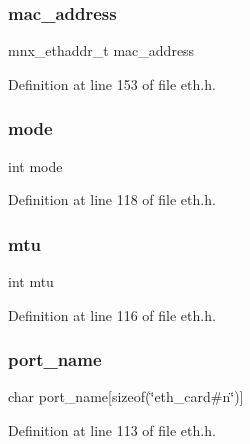 \subsubsection{\texorpdfstring{mac\+\_\+address}{mac\_address}}
{\footnotesize\ttfamily mnx\+\_\+ethaddr\+\_\+t mac\+\_\+address}



Definition at line 153 of file eth.\+h.

\hypertarget{structeth__card_a1ea5d0cb93f22f7d0fdf804bd68c3326}{}\label{structeth__card_a1ea5d0cb93f22f7d0fdf804bd68c3326} 
\subsubsection{\texorpdfstring{mode}{mode}}
{\footnotesize\ttfamily int mode}



Definition at line 118 of file eth.\+h.

\hypertarget{structeth__card_a5f8594e356005c64e4a2625755b6c849}{}\label{structeth__card_a5f8594e356005c64e4a2625755b6c849} 
\subsubsection{\texorpdfstring{mtu}{mtu}}
{\footnotesize\ttfamily int mtu}



Definition at line 116 of file eth.\+h.

\hypertarget{structeth__card_aac454ceb9ecfa543e7aaac535e33e536}{}\label{structeth__card_aac454ceb9ecfa543e7aaac535e33e536} 
\subsubsection{\texorpdfstring{port\+\_\+name}{port\_name}}
{\footnotesize\ttfamily char port\+\_\+name\mbox{[}sizeof(\char`\"{}eth\+\_\+card\#n\char`\"{})\mbox{]}}



Definition at line 113 of file eth.\+h.

\hypertarget{structeth__card_a646fea47457cd5bcd8ae53d33de606c4}{}\label{structeth__card_a646fea47457cd5bcd8ae53d33de606c4} 
